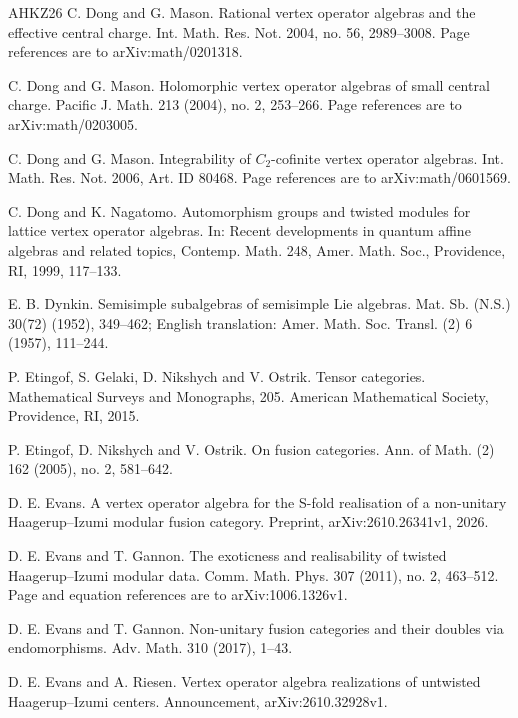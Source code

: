 \documentclass[leqno]{article}
\numberwithin{equation}{section}
\begin{document}
\begin{thebibliography}{AHKZ26}
C. Dong and G. Mason.
\newblock Rational vertex operator algebras and the effective central charge.
\newblock Int. Math. Res. Not. 2004, no. 56, 2989--3008. Page references are to arXiv:math/0201318.

C. Dong and G. Mason.
\newblock Holomorphic vertex operator algebras of small central charge.
\newblock Pacific J. Math. 213 (2004), no. 2, 253--266. Page references are to arXiv:math/0203005.

C. Dong and G. Mason.
\newblock Integrability of $C_2$-cofinite vertex operator algebras.
\newblock Int. Math. Res. Not. 2006, Art. ID 80468. Page references are to arXiv:math/0601569.

C. Dong and K. Nagatomo.
\newblock Automorphism groups and twisted modules for lattice vertex operator algebras.
\newblock In: Recent developments in quantum affine algebras and related topics, Contemp. Math. 248, Amer. Math. Soc., Providence, RI, 1999, 117--133.

E. B. Dynkin.
\newblock Semisimple subalgebras of semisimple Lie algebras.
\newblock Mat. Sb. (N.S.) 30(72) (1952), 349--462; English translation: Amer. Math. Soc. Transl. (2) 6 (1957), 111--244.

P. Etingof, S. Gelaki, D. Nikshych and V. Ostrik.
\newblock Tensor categories.
\newblock Mathematical Surveys and Monographs, 205. American Mathematical Society, Providence, RI, 2015.

P. Etingof, D. Nikshych and V. Ostrik.
\newblock On fusion categories.
\newblock Ann. of Math. (2) 162 (2005), no. 2, 581--642.

D. E. Evans.
\newblock A vertex operator algebra for the S-fold realisation of a non-unitary Haagerup--Izumi modular fusion category.
\newblock Preprint, arXiv:2610.26341v1, 2026.

D. E. Evans and T. Gannon.
\newblock The exoticness and realisability of twisted Haagerup--Izumi modular data.
\newblock Comm. Math. Phys. 307 (2011), no. 2, 463--512. Page and equation references are to arXiv:1006.1326v1.

D. E. Evans and T. Gannon.
\newblock Non-unitary fusion categories and their doubles via endomorphisms.
\newblock Adv. Math. 310 (2017), 1--43.

D. E. Evans and A. Riesen.
\newblock Vertex operator algebra realizations of untwisted Haagerup--Izumi centers.
\newblock Announcement, arXiv:2610.32928v1.


\end{thebibliography}
\end{document}
